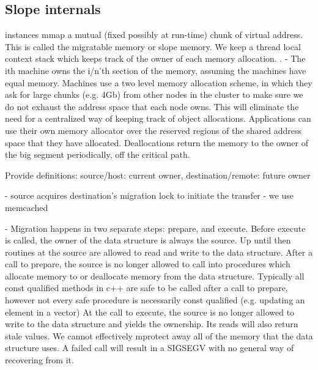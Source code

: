 \begin{vertbatim}
\section{Slope internals}

instances mmap a mutual (fixed possibly at run-time) chunk of virtual address. This is called the migratable memory or slope memory.
We keep a thread local context stack which keeps track of the owner of each memory allocation. .
- The ith machine owns the i/n'th section of the memory, assuming the machines have equal memory. Machines use a two level memory
allocation scheme, in which they ask for large chunks (e.g. 4Gb) from other nodes in the cluster to make sure we do not exhaust
the address space that each node owns. This will eliminate the need for a centralized way of keeping track of object allocations.
Applications can use their own memory allocator over the reserved regions of the shared address space that they have allocated.
Deallocations return the memory to the owner of the big segment periodically, off the critical path. 

Provide definitions: source/host: current owner, destination/remote: future owner

- source acquires destination's migration lock to initiate the transfer
    - we use memcached

- Migration happens in two separate steps: prepare, and execute. Before execute
  is called, the owner of the data structure is always the source. Up until then
  routines at the source are allowed to read and write to the data structure.
  After a call to prepare, the source is no longer allowed to call into
  procedures which allocate memory to or deallocate memory from the data structure. Typically all const qualified methods in c++ 
  are safe to be called after a call to prepare, however not every safe procedure is necessarily const qualified (e.g. updating an element in a vector)
  At the call to execute, the source is no longer allowed to write to the data structure and yields the ownership. Its reads will also return stale values.
  We cannot effectively mprotect away all of the memory that the data structure uses. A failed call will result in a SIGSEGV with no general way of
  recovering from it.


\end{vertbatim}
